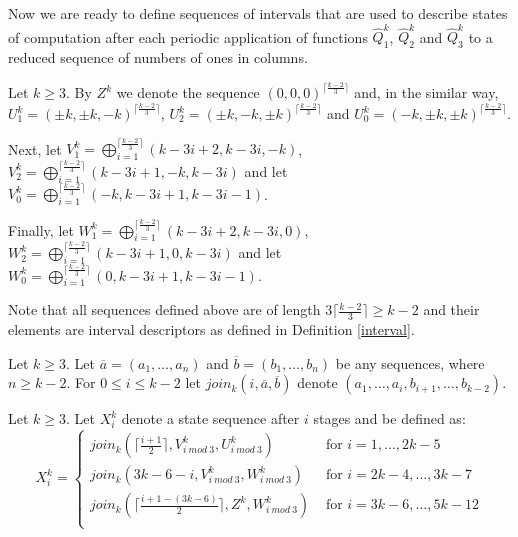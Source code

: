 \documentclass{llncs}
\begin{document}
Now we are ready to define sequences of intervals that are used to
describe states of computation after each periodic application of
functions $\hat{Q}^k_1$, $\hat{Q}^k_2$ and $\hat{Q}^k_3$ to a reduced
sequence of numbers of ones in columns.

\begin{definition}
Let $k\ge 3$. By $Z^k$ we denote the sequence
$(0,0,0)^{\lceil\frac{k-2}{3}\rceil}$ and, in the similar way, $U^k_1 =
(\pm k, \pm k, -k)^{\lceil\frac{k-2}{3}\rceil}$, $U^k_2 = (\pm k, -k,
\pm k)^{\lceil\frac{k-2}{3}\rceil}$ and $U^k_0 = (-k, \pm k, \pm
k)^{\lceil\frac{k-2}{3}\rceil}$.

Next, let $V^k_1 = \bigoplus_{i=1}^{\lceil\frac{k-2}{3}\rceil} (k-3i+2,
k-3i, -k)$, $V^k_2 = \bigoplus_{i=1}^{\lceil\frac{k-2}{3}\rceil}
(k-3i+1, -k, k-3i)$ and let $V^k_0 =
\bigoplus_{i=1}^{\lceil\frac{k-2}{3}\rceil} (-k, k-3i+1, k-3i-1)$.

Finally, let $W^k_1 = \bigoplus_{i=1}^{\lceil\frac{k-2}{3}\rceil}
(k-3i+2, k-3i, 0)$, $W^k_2 = \bigoplus_{i=1}^{\lceil\frac{k-2}{3}\rceil}
(k-3i+1, 0, k-3i)$ and let $W^k_0 =
\bigoplus_{i=1}^{\lceil\frac{k-2}{3}\rceil} (0, k-3i+1, k-3i-1)$.
\end{definition}

Note that all sequences defined above are of length
$3\lceil\frac{k-2}{3}\rceil \ge k-2$ and their elements are interval
descriptors as defined in Definition \ref{interval}.

\begin{definition}
Let $k\ge 3$. Let $\overline{a}=(a_1,\ldots,a_n)$ and
$\overline{b}=(b_1,\ldots,b_n)$ be any sequences, where $n\ge k-2$. For
$0\le i\le k-2$ let $join_k(i,\overline{a},\overline{b})$ denote $(a_1,
\ldots, a_i, b_{i+1}, \ldots, b_{k-2})$.
\end{definition}

\begin{definition}\label{def-X}
Let $k\ge 3$. Let $X^k_i$ denote a state sequence after $i$ stages and
be defined as:
$$ X^k_i = \left\{
\begin{array}{ll}
join_k(\lceil\frac{i+1}{2}\rceil,V^k_{i~mod~3},U^k_{i~mod~3}) & 
					\mbox{ for }i = 1,\ldots,2k-5\\
join_k(3k-6-i,V^k_{i~mod~3},W^k_{i~mod~3}) & 
					\mbox{ for }i = 2k-4,\ldots,3k-7\\
join_k(\lceil\frac{i+1-(3k-6)}{2}\rceil,Z^k,W^k_{i~mod~3}) & 
					\mbox{ for }i = 3k-6,\ldots,5k-12\\
\end{array}
\right. $$
\end{definition}
\end{document}
